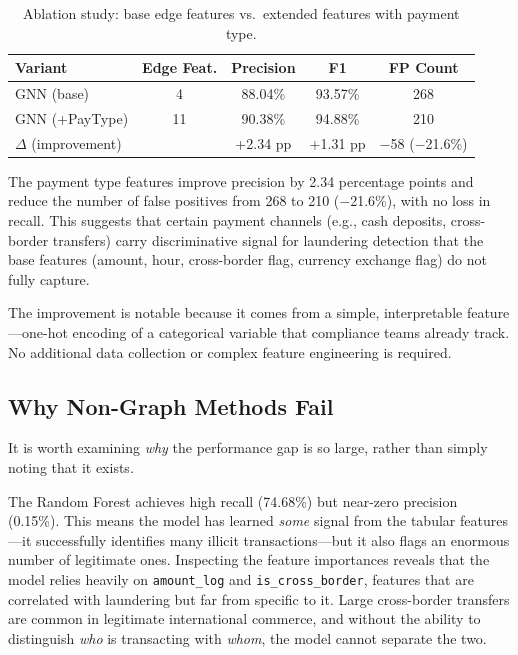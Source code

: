 \documentclass[conference]{IEEEtran}
\begin{document}
\begin{table}[htbp]
\caption{Ablation study: base edge features vs.\ extended features with payment type.}
\label{tab:ablation}
\centering
\begin{tabular}{@{}lcccc@{}}
\toprule
Variant & Edge Feat. & Precision & F1 & FP Count \\
\midrule
GNN (base) & 4 & 88.04\% & 93.57\% & 268 \\
GNN (+PayType) & 11 & 90.38\% & 94.88\% & 210 \\
\midrule
\multicolumn{2}{l}{$\Delta$ (improvement)} & +2.34 pp & +1.31 pp & $-$58 ($-$21.6\%) \\
\bottomrule
\end{tabular}
\end{table}

The payment type features improve precision by 2.34 percentage points and reduce the number of false positives from 268 to 210 ($-$21.6\%), with no loss in recall. This suggests that certain payment channels (e.g., cash deposits, cross-border transfers) carry discriminative signal for laundering detection that the base features (amount, hour, cross-border flag, currency exchange flag) do not fully capture.

The improvement is notable because it comes from a simple, interpretable feature---one-hot encoding of a categorical variable that compliance teams already track. No additional data collection or complex feature engineering is required.

\subsection{Why Non-Graph Methods Fail}

It is worth examining \textit{why} the performance gap is so large, rather than simply noting that it exists.

The Random Forest achieves high recall (74.68\%) but near-zero precision (0.15\%). This means the model has learned \textit{some} signal from the tabular features---it successfully identifies many illicit transactions---but it also flags an enormous number of legitimate ones. Inspecting the feature importances reveals that the model relies heavily on \texttt{amount\_log} and \texttt{is\_cross\_border}, features that are correlated with laundering but far from specific to it. Large cross-border transfers are common in legitimate international commerce, and without the ability to distinguish \textit{who} is transacting with \textit{whom}, the model cannot separate the two.
\end{document}
